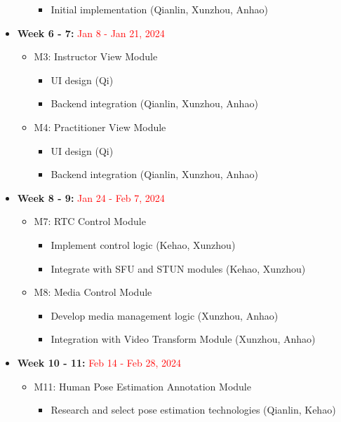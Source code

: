 \documentclass[12pt, titlepage]{article}
\newcommand{\rt}[1]{\textcolor{red}{#1}}
\begin{document}
\begin{itemize}
\begin{itemize}
\begin{itemize}
          \item Initial implementation (Qianlin, Xunzhou, Anhao)
      \end{itemize}
  \end{itemize}
  \item \textbf{Week 6 - 7:} \rt{Jan 8 - Jan 21, 2024}
  \begin{itemize}
      \item M3: Instructor View Module
      \begin{itemize}
          \item UI design (Qi)
          \item Backend integration (Qianlin, Xunzhou, Anhao)
      \end{itemize}
      \item M4: Practitioner View Module
      \begin{itemize}
          \item UI design (Qi)
          \item Backend integration (Qianlin, Xunzhou, Anhao)
      \end{itemize}
  \end{itemize}
  \item \textbf{Week 8 - 9:} \rt{Jan 24 - Feb 7, 2024}
  \begin{itemize}
      \item M7: RTC Control Module
      \begin{itemize}
          \item Implement control logic (Kehao, Xunzhou)
          \item Integrate with SFU and STUN modules (Kehao, Xunzhou)
      \end{itemize}
      \item M8: Media Control Module
      \begin{itemize}
          \item Develop media management logic (Xunzhou, Anhao)
          \item Integration with Video Transform Module (Xunzhou, Anhao)
      \end{itemize}
  \end{itemize}
  \item \textbf{Week 10 - 11:} \rt{Feb 14 - Feb 28, 2024}
  \begin{itemize}
      \item M11: Human Pose Estimation Annotation Module
      \begin{itemize}
          \item Research and select pose estimation technologies (Qianlin, Kehao)

\end{itemize}
\end{itemize}
\end{itemize}
\end{document}
